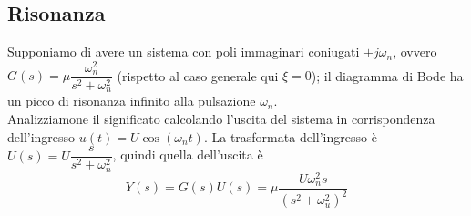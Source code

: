 \documentclass{article}
\numberwithin{equation}{subsection}
\let\oldsubsection\subsection%
\renewcommand{\subsection}{%
  \renewcommand{\theequation}{\thesubsection.\arabic{equation}}%
  \oldsubsection}%
\begin{document}
\subsection{Risonanza}
Supponiamo di avere un sistema con poli immaginari coniugati $\pm j \omega_n$, ovvero $G(s) = \mu \dfrac{\omega_n^2}{s^2+\omega_n^2}$ (rispetto al caso generale qui $\xi = 0$); il diagramma di Bode ha un picco di risonanza infinito alla pulsazione $\omega_n$.
\vspace*{0.1cm}\\
Analizziamone il significato calcolando l'uscita del sistema in corrispondenza dell'ingresso $u(t) = U \cos(\omega_n t)$. La trasformata dell'ingresso è $U(s) = U \dfrac{s}{s^2+\omega_n^2}$, quindi quella dell'uscita è
\begin{equation*}
    Y(s) = G(s)U(s) = \mu \frac{U \omega_n^2 s}{(s^2 + \omega_u^2)^2}
\end{equation*}
\end{document}
